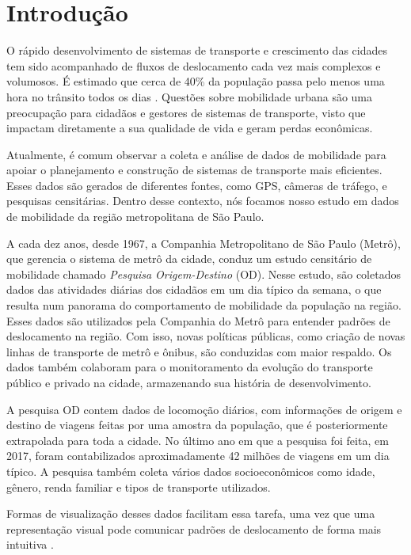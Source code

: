 \chapter{Introdução}
\label{cap:introducao}

O rápido  desenvolvimento de sistemas de transporte e crescimento das cidades
tem sido acompanhado de fluxos de deslocamento cada vez mais complexos e
volumosos. É estimado que cerca de 40\% da população passa pelo menos uma hora
no trânsito todos os dias \citep{Zhang2011}. Questões sobre mobilidade urbana
são uma preocupação para cidadãos e gestores de sistemas de transporte, visto
que impactam diretamente a sua qualidade de vida e geram perdas econômicas. 

Atualmente, é comum observar a coleta e análise de dados de mobilidade para
apoiar o planejamento e construção de sistemas de transporte mais eficientes.
Esses dados são gerados de diferentes fontes, como GPS, câmeras de tráfego, e
pesquisas censitárias. Dentro desse contexto, nós focamos nosso estudo em dados
de mobilidade da região metropolitana de S\~ao Paulo.

A cada dez anos, desde 1967, a Companhia Metropolitano de São Paulo (Metrô),
que gerencia o sistema de metrô da cidade, conduz um estudo censitário de
mobilidade chamado \emph{Pesquisa Origem-Destino} (OD). Nesse estudo, são
coletados dados das atividades diárias dos cidadãos em um dia típico da semana,
o que resulta num panorama do comportamento de mobilidade da população na
região. Esses dados são utilizados pela Companhia do Metrô para entender
padrões de deslocamento na região. Com isso, novas políticas públicas, como
criação de novas linhas de transporte de metrô e ônibus, são conduzidas com
maior respaldo. Os dados também colaboram para o monitoramento da evolução do
transporte público e privado na cidade, armazenando sua história de
desenvolvimento.

A pesquisa OD contem dados de locomoção diários, com informações de origem e
destino de viagens feitas por uma amostra da população, que é posteriormente
extrapolada para toda a cidade. No último ano em que a pesquisa foi feita, em
2017, foram contabilizados aproximadamente 42 milhões de viagens em um dia
típico. A pesquisa também coleta vários dados socioeconômicos como idade,
gênero, renda familiar e tipos de transporte utilizados. 

Formas de visualização desses dados facilitam essa tarefa, uma vez que uma
representação visual pode comunicar padrões de deslocamento de forma mais
intuitiva \citep{Liu2013}. 



